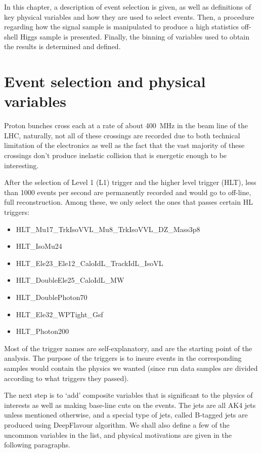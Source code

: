 In this chapter, a description of event selection is given, as well as definitions of
key physical variables and how they are used to select events. Then, a procedure regarding
how the signal sample is manipulated to produce a high statistics off-shell Higgs sample is presented.
Finally, the binning of variables used to obtain the results is determined and defined.

\section{Event selection and physical variables}
Proton bunches cross each at a rate of about \SI{400}{\mega\hertz} in the beam line of
the LHC, naturally, not all of these crossings are recorded due to both technical
limitation of the electronics as well as the fact that the vast majority of these
crossings don't produce inelastic collision that is energetic enough to be interesting.

After the selection of Level 1 (L1) trigger and the higher level trigger (HLT), less than 1000
events per second are permanently recorded and would go to off-line, full reconstruction. Among these,
we only select the ones that passes certain HL triggers:
\begin{itemize}
    \item HLT\_Mu17\_TrkIsoVVL\_Mu8\_TrkIsoVVL\_DZ\_Mass3p8
    \item HLT\_IsoMu24
    \item HLT\_Ele23\_Ele12\_CaloIdL\_TrackIdL\_IsoVL
    \item HLT\_DoubleEle25\_CaloIdL\_MW
    \item HLT\_DoublePhoton70
    \item HLT\_Ele32\_WPTight\_Gsf
    \item HLT\_Photon200
\end{itemize}
Most of the trigger names are self-explanatory, and are the starting point of the analysis. The
purpose of the triggers is to insure events in the corresponding samples would contain the physics
we wanted (since run data samples are divided according to what triggers they passed).

The next step is to `add' composite variables that is significant to the physics of interests as
well as making base-line cuts on the events.
The jets are all AK4 jets unless mentioned otherwise, and a special type of jets, called B-tagged
jets are produced using DeepFlavour algorithm.\cite{btag} We shall also define a few of the
uncommon variables in the list, and physical motivations are given in the following
paragraphs.

